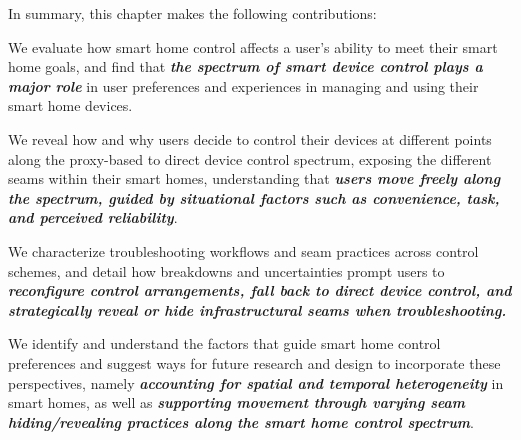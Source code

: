 In summary, this chapter makes the following contributions:
\begin{itemize}
    \item We evaluate how smart home control affects a user's ability to meet their smart home goals, and find that \textbf{\textit{the spectrum of smart device control plays a major role}} in user preferences and experiences in managing and using their smart home devices.
    \item We reveal how and why users decide to control their devices at different points along the proxy-based to direct device control spectrum, exposing the different seams within their smart homes, understanding that  \textbf{\textit{users move freely along the spectrum, guided by situational factors such as convenience, task, and perceived reliability}}.
    {
    \item We characterize troubleshooting workflows and seam practices across control schemes, and detail how breakdowns and uncertainties prompt users to \textit{\textbf{reconfigure control arrangements, fall back to direct device control, and strategically reveal or hide infrastructural seams when troubleshooting.}}
    }
    \item We identify and understand the factors that guide smart home control preferences and suggest ways for future research and design to incorporate these perspectives, namely \textbf{\textit{accounting for spatial and temporal heterogeneity}} in smart homes, as well as \textbf{\textit{supporting movement through varying seam hiding/revealing practices along the smart home control spectrum}}.
\end{itemize}


